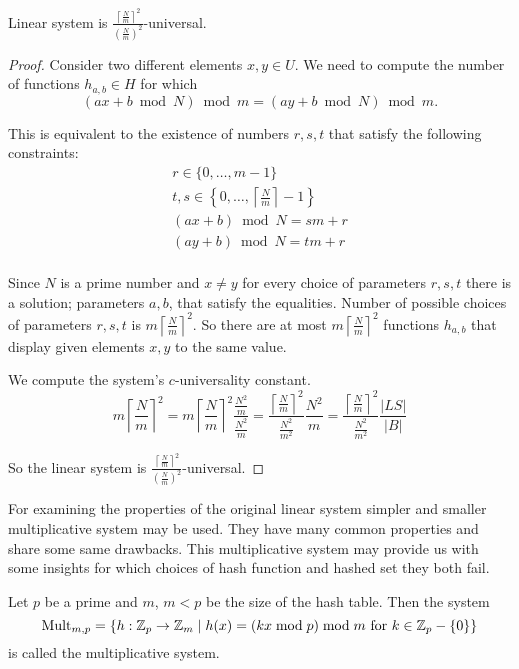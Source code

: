 \begin{remark}
Linear system is $\frac{\left\lceil \frac{N}{m} \right\rceil ^ 2}{\left(\frac{N}{m}\right) ^ 2}$-universal.
\end{remark}
\begin{proof}
Consider two different elements $x, y \in U$. We need to compute the number of functions $h_{a, b} \in H$ for which 
\[ (ax + b \bmod N) \bmod m = (ay + b \bmod N) \bmod m \textit{.} \]

This is equivalent to the existence of numbers $r, s, t$ that satisfy the following constraints:
\begin{gather*}
r \in \{0, \dots, m - 1 \} \\
t, s \in \left\{ 0, \dots, \left \lceil \frac{N}{m} \right \rceil - 1 \right\} \\
(ax + b) \bmod N = s m + r \\
(ay + b) \bmod N = t m + r \\
\end{gather*}

Since $N$ is a prime number and $x \neq y$ for every choice of parameters $r, s, t$ there is a solution; parameters $a, b$, that satisfy the equalities.
Number of possible choices of parameters $r, s, t$ is $m \left \lceil \frac{N}{m} \right \rceil ^ 2$. So there are at most $m \left \lceil \frac{N}{m} \right \rceil ^ 2$ functions $h_{a, b}$ that display given elements $x, y$ to the same value.

We compute the system's $c$-universality constant.
\[
m \left \lceil \frac{N}{m} \right \rceil ^ 2 = 
m \left \lceil \frac{N}{m} \right \rceil ^ 2 \frac{\frac{N ^ 2}{m}}{\frac{N ^ 2}{m}} = 
\frac{\left \lceil \frac{N}{m} \right \rceil ^ 2}{\frac{N ^ 2}{m ^ 2}} \frac{N ^ 2}{m} = 
\frac{\left \lceil \frac{N}{m} \right \rceil ^ 2}{\frac{N ^ 2}{m ^ 2}} \frac{|LS|}{|B|}
\]

So the linear system is $\frac{\left \lceil \frac{N}{m} \right \rceil ^ 2}{\left(\frac{N}{m}\right) ^ 2}$-universal.
\end{proof}

For examining the properties of the original linear system simpler and smaller multiplicative system may be used. They have many common properties and share some same drawbacks. This multiplicative system may provide us with some insights for which choices of hash function and hashed set they both fail.

\begin{definition}
Let $p$ be a prime and $m$, $m < p$ be the size of the hash table. Then the system \[ \mathrm{Mult}_{m, p} = \lbrace h:\mathbb{Z}_p \rightarrow \mathbb{Z}_m \mid h(x) = (kx \bmod p) \bmod m \text{ for } k \in \mathbb{Z}_p - \{0\} \rbrace \] is called the multiplicative system.
\end{definition}

